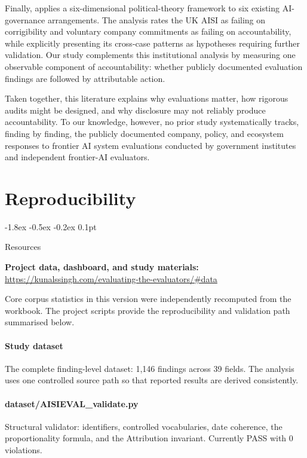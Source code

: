 \documentclass{article}
\makeatletter
\renewcommand{\subsection}{%
  \@startsection{subsection}{2}{\z@}%
                {-1.8ex \@plus -0.5ex \@minus -0.2ex}%
                {0.1pt}%
                {\normalsize\bf\raggedright}%
}
\makeatother
\begin{document}
Finally, \citet{rost2026} applies a six-dimensional political-theory framework to six existing AI-governance arrangements. The analysis rates the UK AISI as failing on corrigibility and voluntary company commitments as failing on accountability, while explicitly presenting its cross-case patterns as hypotheses requiring further validation. Our study complements this institutional analysis by measuring one observable component of accountability: whether publicly documented evaluation findings are followed by attributable action.

Taken together, this literature explains why evaluations matter, how rigorous audits might be designed, and why disclosure may not reliably produce accountability. To our knowledge, however, no prior study systematically tracks, finding by finding, the publicly documented company, policy, and ecosystem responses to frontier AI system evaluations conducted by government institutes and independent frontier-AI evaluators.
\section{Reproducibility}\label{app:reproducibility}
\subsection{Resources}
\begin{flushleft}\textbf{Project data, dashboard, and study materials:}\\\url{https://kunalssingh.com/evaluating-the-evaluators/\#data}\end{flushleft}
Core corpus statistics in this version were independently recomputed from the workbook. The project scripts provide the reproducibility and validation path summarised below.

\paragraph{Study dataset}
The complete finding-level dataset: 1,146 findings across 39 fields. The analysis uses one controlled source path so that reported results are derived consistently.

\paragraph{dataset/AISIEVAL\_validate.py}
Structural validator: identifiers, controlled vocabularies, date coherence, the proportionality formula, and the Attribution invariant. Currently PASS with 0 violations.
\end{document}
